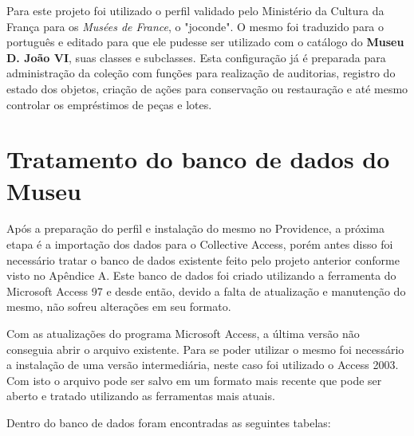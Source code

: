 \documentclass[a4paper,12pt,oneside,onecolumn,final,fleqn]{repUERJ}
\begin{document}
Para este projeto foi utilizado o perfil validado pelo Ministério da Cultura da França para os \textit{Musées de France}, o "joconde". O mesmo foi traduzido para o português e editado para que ele pudesse ser utilizado com o catálogo do \textbf{Museu D. João VI}, suas classes e subclasses. Esta configuração já é preparada para administração da coleção com funções para realização de auditorias, registro do estado dos objetos, criação de ações para conservação ou restauração e até mesmo controlar os empréstimos de peças e lotes.

\section{Tratamento do banco de dados do Museu}

Após a preparação do perfil e instalação do mesmo no Providence, a próxima etapa é a importação dos dados para o Collective Access, porém antes disso foi necessário tratar o banco de dados existente feito pelo projeto anterior conforme visto no Apêndice A. Este banco de dados foi criado utilizando a ferramenta do Microsoft Access 97 e desde então, devido a falta de atualização e manutenção do mesmo, não sofreu alterações em seu formato.

Com as atualizações do programa Microsoft Access, a última versão não conseguia abrir o arquivo existente. Para se poder utilizar o mesmo foi necessário a instalação de uma versão intermediária, neste caso foi utilizado o Access 2003. Com isto o arquivo pode ser salvo em um formato mais recente que pode ser aberto e tratado utilizando as ferramentas mais atuais.

Dentro do banco de dados foram encontradas as seguintes tabelas:
\end{document}
